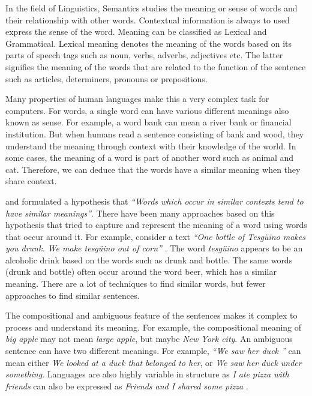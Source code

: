 \documentclass[12pt]{report} %
\begin{document}
	In the field of Linguistics, Semantics studies the meaning or sense of words and their relationship with other words. Contextual information is always to used express the sense of the word. Meaning can be classified as Lexical and Grammatical. Lexical meaning denotes the meaning of the words based on its parts of speech tags such as noun, verbs, adverbs, adjectives etc. The latter signifies the meaning of the words that are related to the function of the sentence such as articles, determiners, pronouns or prepositions.
	
	
	Many properties of human languages make this a very complex task for computers. For words, a single word can have various different meanings also known as sense. For example, a word bank can mean a river bank or financial institution. But when humans read a sentence consisting of bank and wood, they understand the meaning through context with their knowledge of the world. In some cases, the meaning of a word is part of another word such as animal and cat. Therefore, we can deduce that the words have a similar meaning when they share context.
	
	\cite{harris1970distributional} and \cite{firth1957synopsis} formulated a hypothesis that \textit{ \textquotedblleft Words which occur in similar contexts tend to have similar meanings\textquotedblright}. There have been many approaches based on this hypothesis that tried to capture and represent the meaning of a word using words that occur around it. For example, consider a text \textit{ \textquotedblleft One bottle of Tesgüino makes you drunk. We make tesgüino out of corn\textquotedblright} \citep{jurafsky2014speech}.  The word \textit{tesgüino}  appears to be an alcoholic drink based on the words such as drunk and bottle. The same words (drunk and bottle) often occur around the word beer, which has a similar meaning. There are a lot of techniques to find similar words, but fewer approaches to find similar sentences.
	
	
	The compositional and ambiguous feature of the sentences makes it complex to process and understand its meaning. For example, the compositional meaning of \textit{big apple} may not mean \textit{large apple}, but maybe \textit{New York city}. An ambiguous sentence can have two different meanings. For example, \textit{\textquotedblleft We saw her duck \textquotedblright} can mean either \textit{We looked at a duck that belonged to her}, or \textit{We saw her duck under something}. Languages are also highly variable in structure as \textit{I ate pizza with friends} can also be expressed as \textit{Friends and I shared some pizza} \citep{jurafsky2014speech}. %
	
\end{document}
